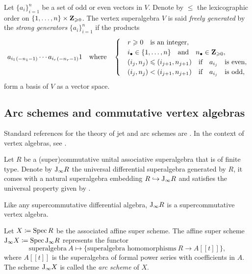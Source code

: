 Let $\{a_i\}_{i=1}^n$ be a set of odd or even vectors in $V$. Denote by $\leqslant$ the lexicographic order on $\{1, \ldots, n\} \times \mathbf{Z}_{\geqslant 0}$. The vertex superalgebra $V$ is said \emph{freely generated} by the \emph{strong generators} $\{a_i\}_{i=1}^n$ if the products
\begin{equation*}
	a_{i_1}{}_{(-n_1 - 1)} \cdots a_{i_r}{}_{(-n_r - 1)} 1 \quad \text{where} \quad 
	\begin{cases}
		& r \geqslant 0 \quad \text{is an integer}, \\
		& i_\bullet \in \{1, \ldots, n\} \quad \text{and} \quad n_\bullet \in \mathbf{Z}_{\geqslant 0}, \\
		& (i_j, n_j) \leqslant (i_{j+1}, n_{j+1}) \quad \text{if} \quad a_{i_j} \quad \text{is even}, \\
		& (i_j, n_j) < (i_{j+1}, n_{j+1}) \quad \text{if} \quad a_{i_j} \quad \text{is odd},
	\end{cases}
\end{equation*}
form a basis of $V$ as a vector space. 

\subsection{Arc schemes and commutative vertex algebras} 
\label{subsection:arc-schemes}

Standard references for the theory of jet and arc schemes are \cite{ein2009jet,chambert2018motivic}. In the context of vertex algebras, see \cite[Section 2.1]{arakawa2015associated}.

Let $R$ be a (super)commutative unital associative superalgebra that is of finite type. Denote by $\mathrm{J}_\infty R$ the universal differential superalgebra generated by $R$, it comes with a natural superalgebra embedding $R \hookrightarrow \mathrm{J}_\infty R$ and satisfies the universal property given by \cite[Remark 3.1]{ein2009jet}.

\begin{lemma}
	Like any supercommutative differential algebra, $\mathrm{J}_\infty R$ is a supercommutative vertex algebra.
\end{lemma} 

Let $X \coloneqq \operatorname{Spec} R$ be the associated affine super scheme. The affine super scheme  $\mathrm{J}_\infty X \coloneqq \operatorname{Spec} \mathrm{J}_\infty R$ represents the functor 
\[ \text{superalgebra} ~ A \longmapsto \{\text{superalgebra homomorphisms} ~  R \rightarrow  A[\![t]\!]\}, \]
where $A[\![t]\!]$ is the superalgebra of formal power series with coefficients in $A$. The scheme $\mathrm{J}_\infty X$ is called the \emph{arc scheme} of $X$.

